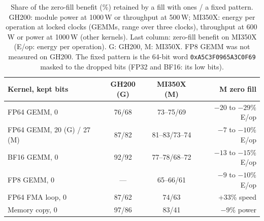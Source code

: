 \documentclass[conference]{IEEEtran}
\newcommand{\W}{\,W}
\newcommand{\pct}{\%}
\begin{document}
\begin{table}[t]
\caption{Share of the zero-fill benefit (\%) retained by a fill with ones / a fixed pattern. GH200: module power at
1000\W{} or throughput at 500\W; MI350X: energy per operation at locked clocks (GEMMs, range over three clocks),
throughput at 600\W{} or power at 1000\W{} (other kernels). Last column: zero-fill benefit on MI350X (E/op: energy per
operation). G: GH200, M: MI350X. FP8 GEMM was not measured on GH200. The fixed pattern is the 64-bit word
\texttt{0xA5C3F0965A3C0F69} masked to the dropped bits (FP32 and BF16: its low bits).}\label{tab:fill2}
\centering\scriptsize\setlength{\tabcolsep}{3pt}
\begin{tabular}{@{}lccr@{}}
\toprule
Kernel, kept bits & GH200 (G) & MI350X (M) & M zero fill \\
\midrule
FP64 GEMM, 0 & 76/68 & 73--75/69 & $-20$ to $-29\pct$ E/op \\
FP64 GEMM, 20 (G) / 27 (M) & 87/82 & 81--83/73--74 & $-7$ to $-10\pct$ E/op \\
BF16 GEMM, 0 & 92/92 & 77--78/68--72 & $-13$ to $-15\pct$ E/op \\
FP8 GEMM, 0 & --- & 65--66/61 & $-9$ to $-10\pct$ E/op \\
FP64 FMA loop, 0 & 87/62 & 74/63 & +33\pct{} speed \\
Memory copy, 0 & 97/86 & 83/41 & $-9\pct$ power \\
\bottomrule
\end{tabular}
\end{table}
\end{document}
